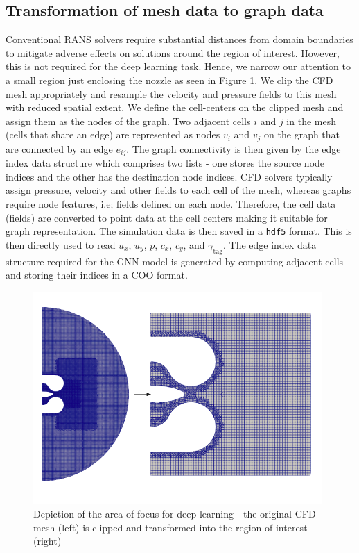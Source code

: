 \subsection{Transformation of mesh data to graph data}
Conventional \gls{RANS} solvers require substantial distances from domain boundaries to mitigate adverse effects on solutions around the region of interest. However, this is not required for the deep learning task. Hence, we narrow our attention to a small region just enclosing the nozzle as seen in Figure \ref{clipmesh}. We clip the CFD mesh appropriately and resample the velocity and pressure fields to this mesh with reduced spatial extent. We define the cell-centers on the clipped mesh and assign them as the nodes of the graph. Two adjacent cells $i$ and $j$ in the mesh (cells that share an edge) are represented as nodes $v_i$ and $v_j$ on the graph that are connected by an edge $e_{ij}$. The graph connectivity is then given by the edge index data structure which comprises two lists - one stores the source node indices and the other has the destination node indices. CFD solvers typically assign pressure, velocity and other fields to each cell of the mesh, whereas graphs require node features, i.e; fields defined on each node. Therefore, the cell data (fields) are converted to point data at the cell centers making it suitable for graph representation. The simulation data is then saved in a \verb|hdf5| format. This is then directly used to read $u_{x}$, $u_{y}$, $p$, $c_x$, $c_y$, and $\gamma_{\operatorname{tag}}$. The edge index data structure required for the GNN model is generated by computing adjacent cells and storing their indices in a \gls{COO} format. 
\begin{figure}[ht]
    \centering
    \includegraphics[width=11cm]{images/Methodology/Clipped.png}
    \caption{Depiction of the area of focus for deep learning - the original CFD mesh (left) is clipped and transformed into the region of interest (right)}
    \label{clipmesh}
\end{figure}
